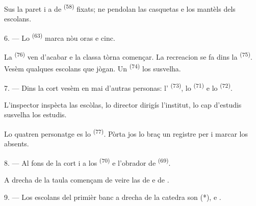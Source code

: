 Sus la paret i a de  \textsuperscript{(58)} fixats; ne pendolan
las casquetas e los mantèls dels escolans.

\VUsaut{5.2mm}
\VUsaut{3.6mm}

6. --- Lo  \textsuperscript{(63)} marca nòu oras e cinc.

La  \textsuperscript{(76)} ven d'acabar e la classa tòrna
començar. La recreacion se fa dins la  \textsuperscript{(75)}. Vesèm
qualques escolans que jògan. Un  \textsuperscript{(74)}
los susvelha.

7. --- Dins la cort vesèm en mai d'autras personas: l'
\textsuperscript{(73)}, lo  \textsuperscript{(71)} e lo
 \textsuperscript{(72)}.

L'inspector inspècta las escòlas, lo director dirigís l'institut, lo cap
d'estudis susvelha los estudis.

Lo quatren personatge es lo  \textsuperscript{(77)}. Pòrta jos
lo braç un registre per i marcar los absents.

8. --- Al fons de la cort i a los 
\textsuperscript{(70)} e l'obrador de 
\textsuperscript{(69)}.

A drecha de la taula començam de veire las  de  e de
.


\VUsaut{2.4mm}

\VUsaut{3.0mm}

9. --- Los escolans del primièr banc a drecha de la catedra son 
(*),  e .

